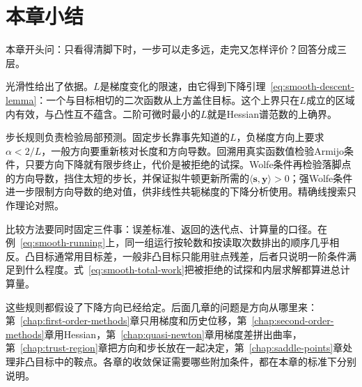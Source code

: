 \section{本章小结}
\label{sec:smooth-summary}

本章开头问：只看得清脚下时，一步可以走多远，走完又怎样评价？回答分成三层。

光滑性给出了依据。$L$是梯度变化的限速，由它得到下降引理~\eqref{eq:smooth-descent-lemma}：一个与目标相切的二次函数从上方盖住目标。这个上界只在$L$成立的区域内有效，与凸性互不蕴含。二阶可微时最小的$L$就是Hessian谱范数的上确界。

步长规则负责检验局部预测。固定步长靠事先知道的$L$，负梯度方向上要求$\alpha<2/L$，一般方向要重新核对长度和方向导数。回溯用真实函数值检验Armijo条件，只要方向下降就有限步终止，代价是被拒绝的试探。Wolfe条件再检验落脚点的方向导数，挡住太短的步长，并保证拟牛顿更新所需的$\langle\bm{s},\bm{y}\rangle>0$；强Wolfe条件进一步限制方向导数的绝对值，供非线性共轭梯度的下降分析使用。精确线搜索只作理论对照。

比较方法要同时固定三件事：误差标准、返回的迭代点、计算量的口径。在例~\eqref{eq:smooth-running}上，同一组运行按轮数和按读取次数排出的顺序几乎相反。凸目标通常用目标差，一般非凸目标只能用驻点残差，后者只说明一阶条件满足到什么程度。式~\eqref{eq:smooth-total-work}把被拒绝的试探和内层求解都算进总计算量。

这些规则都假设了下降方向已经给定。后面几章的问题是方向从哪里来：第~\ref{chap:first-order-methods}章只用梯度和历史位移，第~\ref{chap:second-order-methods}章用Hessian，第~\ref{chap:quasi-newton}章用梯度差拼出曲率，第~\ref{chap:trust-region}章把方向和步长放在一起决定，第~\ref{chap:saddle-points}章处理非凸目标中的鞍点。各章的收敛保证需要哪些附加条件，都在本章的标准下分别说明。
